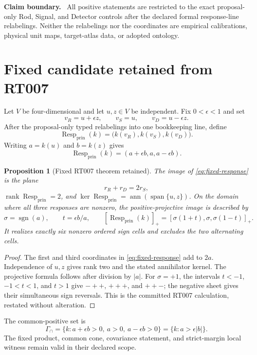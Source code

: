 \documentclass[11pt]{article}
\newtheorem{proposition}[theorem]{Proposition}
\newenvironment{boundary}{\par\smallskip\noindent\textbf{Claim boundary.}\ }{\par\smallskip}
\newcommand{\Resp}{\operatorname{Resp}_{\mathrm{prin}}}
\newcommand{\ann}{\operatorname{ann}}
\newcommand{\sgn}{\operatorname{sgn}}
\begin{document}
\begin{boundary}
All positive statements are restricted to the exact proposal-only Rod,
Signal, and Detector controls after the declared formal response-line
relabelings.  Neither the relabelings nor the coordinates are empirical
calibrations, physical unit maps, target-atlas data, or adopted ontology.
\end{boundary}

\section{Fixed candidate retained from RT007}

Let $V$ be four-dimensional and let $u,z\in V$ be independent.  Fix
$0<\epsilon<1$ and set
\[
 v_R=u+\epsilon z,\qquad v_S=u,\qquad v_D=u-\epsilon z.
\]
After the proposal-only typed relabelings into one bookkeeping line, define
\[
 \Resp(k)=\bigl(k(v_R),k(v_S),k(v_D)\bigr).
\]
Writing $a=k(u)$ and $b=k(z)$ gives
\begin{equation}\label{eq:fixed-response}
 \Resp(k)=(a+\epsilon b,a,a-\epsilon b).
\end{equation}

\begin{proposition}[Fixed RT007 theorem retained]
The image of \eqref{eq:fixed-response} is the plane
\[
 r_R+r_D=2r_S,
\]
$\operatorname{rank}\Resp=2$, and
$\ker\Resp=\ann(\operatorname{span}\{u,z\})$.  On the domain where all three
responses are nonzero, the positive-projective image is described by
\[
 \sigma=\sgn(a),\qquad
 t=\epsilon b/a,\qquad
 [\Resp(k)]_+=[\sigma(1+t),\sigma,\sigma(1-t)]_+.
\]
It realizes exactly six nonzero ordered sign cells and excludes the two
alternating cells.
\end{proposition}

\begin{proof}
The first and third coordinates in \eqref{eq:fixed-response} add to $2a$.
Independence of $u,z$ gives rank two and the stated annihilator kernel.  The
projective formula follows after division by $|a|$.  For $\sigma=+1$, the
intervals $t<-1$, $-1<t<1$, and $t>1$ give $-++$, $+++$, and $++-$;
the negative sheet gives their simultaneous sign reversals.  This is the
committed RT007 calculation, restated without alteration.
\end{proof}

The common-positive set is
\[
 \Gamma_\cap=\{k:a+\epsilon b>0,\ a>0,\ a-\epsilon b>0\}
              =\{k:a>\epsilon|b|\}.
\]
The fixed product, common cone, covariance statement, and strict-margin local
witness remain valid in their declared scope.
\end{document}
